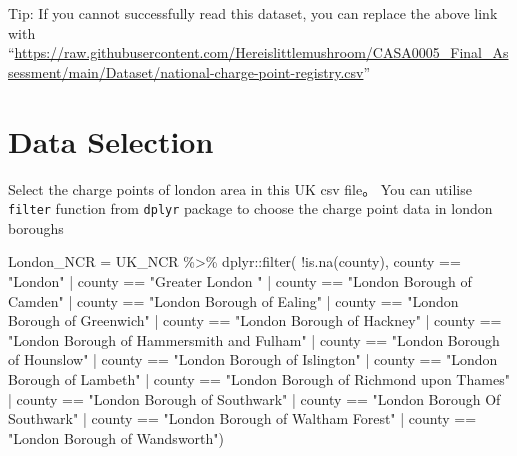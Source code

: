 \documentclass[
]{book}
\newenvironment{Shaded}{\begin{snugshade}}{\end{snugshade}}
\newcommand{\FunctionTok}[1]{\textcolor[rgb]{0.00,0.00,0.00}{#1}}
\newcommand{\NormalTok}[1]{#1}
\newcommand{\OtherTok}[1]{\textcolor[rgb]{0.56,0.35,0.01}{#1}}
\newcommand{\SpecialCharTok}[1]{\textcolor[rgb]{0.00,0.00,0.00}{#1}}
\newcommand{\StringTok}[1]{\textcolor[rgb]{0.31,0.60,0.02}{#1}}
\begin{document}
Tip: If you cannot successfully read this dataset, you can replace the above link with ``\url{https://raw.githubusercontent.com/Hereislittlemushroom/CASA0005_Final_Assessment/main/Dataset/national-charge-point-registry.csv}''

\hypertarget{data-selection}{%
\section{Data Selection}\label{data-selection}}

Select the charge points of london area in this UK csv file。
You can utilise \texttt{filter} function from \texttt{dplyr} package to choose the charge point data in london boroughs

\begin{Shaded}
\begin{Highlighting}[]
\NormalTok{London\_NCR }\OtherTok{=}\NormalTok{ UK\_NCR }\SpecialCharTok{\%\textgreater{}\%}
\NormalTok{  dplyr}\SpecialCharTok{::}\FunctionTok{filter}\NormalTok{(  }\SpecialCharTok{!}\FunctionTok{is.na}\NormalTok{(county),}
\NormalTok{                  county }\SpecialCharTok{==} \StringTok{"London"} \SpecialCharTok{|} 
\NormalTok{                  county }\SpecialCharTok{==} \StringTok{"Greater London "} \SpecialCharTok{|} 
\NormalTok{                  county }\SpecialCharTok{==} \StringTok{"London Borough of Camden"} \SpecialCharTok{|}
\NormalTok{                  county }\SpecialCharTok{==} \StringTok{"London Borough of Ealing"} \SpecialCharTok{|} 
\NormalTok{                  county }\SpecialCharTok{==} \StringTok{"London Borough of Greenwich"} \SpecialCharTok{|} 
\NormalTok{                  county }\SpecialCharTok{==} \StringTok{"London Borough of Hackney"} \SpecialCharTok{|} 
\NormalTok{                  county }\SpecialCharTok{==} \StringTok{"London Borough of Hammersmith and Fulham"} \SpecialCharTok{|} 
\NormalTok{                  county }\SpecialCharTok{==} \StringTok{"London Borough of Hounslow"} \SpecialCharTok{|} 
\NormalTok{                  county }\SpecialCharTok{==} \StringTok{"London Borough of Islington"} \SpecialCharTok{|} 
\NormalTok{                  county }\SpecialCharTok{==} \StringTok{"London Borough of Lambeth"} \SpecialCharTok{|} 
\NormalTok{                  county }\SpecialCharTok{==} \StringTok{"London Borough of Richmond upon Thames"} \SpecialCharTok{|} 
\NormalTok{                  county }\SpecialCharTok{==} \StringTok{"London Borough of Southwark"} \SpecialCharTok{|}
\NormalTok{                  county }\SpecialCharTok{==} \StringTok{"London Borough Of Southwark"} \SpecialCharTok{|}
\NormalTok{                  county }\SpecialCharTok{==} \StringTok{"London Borough of Waltham Forest"} \SpecialCharTok{|} 
\NormalTok{                  county }\SpecialCharTok{==} \StringTok{"London Borough of Wandsworth"}\NormalTok{)}
\end{Highlighting}
\end{Shaded}
\end{document}
